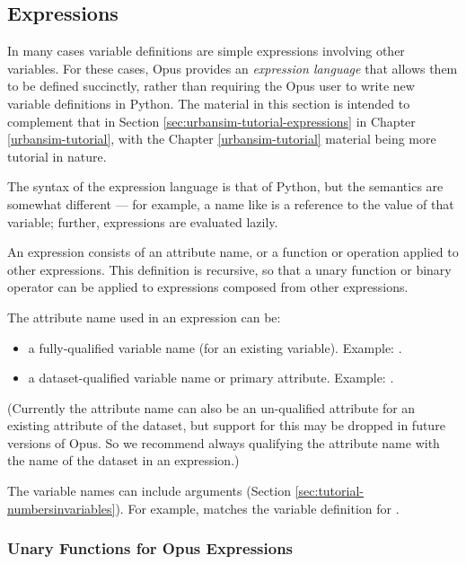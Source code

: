 {\subsection{Expressions}
\label{sec:opus-core-expressions}

In many cases variable definitions are simple expressions involving other
variables.  For these cases, Opus provides an \emph{expression language}
that allows them to be defined succinctly, rather than requiring the Opus
user to write new variable definitions in Python.  The material in this
section is intended to complement that in Section
\ref{sec:urbansim-tutorial-expressions} in Chapter \ref{urbansim-tutorial},
with the Chapter \ref{urbansim-tutorial} material being more tutorial in
nature.

The syntax of the expression language is that of Python, but the semantics
are somewhat different --- for example, a name like
 is a reference to the value of that
variable; further, expressions are evaluated lazily.

An expression consists of an attribute name, or a function or operation
applied to other expressions.  This definition is recursive, so that a
unary function or binary operator can be applied to expressions composed
from other expressions.

The attribute name used in an expression can be:

\begin{itemize}
\item a fully-qualified variable name (for an existing variable).  Example:
.

\item a dataset-qualified variable name or primary attribute.
Example: .
\end{itemize}

(Currently the attribute name can also be an un-qualified attribute for an
existing attribute of the dataset, but support for this may be dropped in
future versions of Opus.  So we recommend always qualifying the attribute
name with the name of the dataset in an expression.)

The variable names can include arguments (Section
\ref{sec:tutorial-numbersinvariables}).  For example,
 matches the variable definition
for .

\subsubsection{Unary Functions for Opus Expressions}

}
